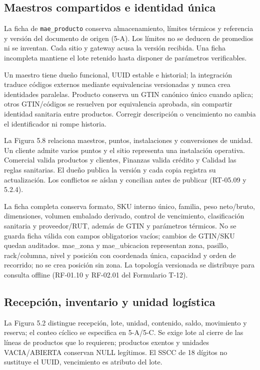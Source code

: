 \subsection{Maestros compartidos e identidad única}
\label{sec:sd5-5-1-3}

La ficha de \texttt{mae\_\allowbreak{}producto} conserva almacenamiento, límites térmicos y referencia y versión del documento de origen (5-A). Los límites no se deducen de promedios ni se inventan. Cada sitio y gateway acusa la versión recibida. Una ficha incompleta mantiene el lote retenido hasta disponer de parámetros verificables.

Un maestro tiene dueño funcional, UUID estable e historial; la integración traduce códigos externos mediante equivalencias versionadas y nunca crea identidades paralelas. Producto conserva un GTIN canónico único cuando aplica; otros GTIN/códigos se resuelven por equivalencia aprobada, sin compartir identidad sanitaria entre productos. Corregir descripción o vencimiento no cambia el identificador ni rompe historia.

La Figura 5.8 relaciona maestros, puntos, instalaciones y conversiones de unidad. Un cliente admite varios puntos y el sitio representa una instalación operativa. Comercial valida productos y clientes, Finanzas valida crédito y Calidad las reglas sanitarias. El dueño publica la versión y cada copia registra su actualización. Los conflictos se aíslan y concilian antes de publicar (RT-05.09 y 5.2.4).

La ficha completa conserva formato, SKU interno único, familia, peso neto/bruto, dimensiones, volumen embalado derivado, control de vencimiento, clasificación sanitaria y proveedor/RUT, además de GTIN y parámetros térmicos. No se guarda ficha válida con campos obligatorios vacíos; cambios de GTIN/SKU quedan auditados. mae\_zona y mae\_ubicacion representan zona, pasillo, rack/columna, nivel y posición con coordenada única, capacidad y orden de recorrido; no se crea posición sin zona. La topología versionada se distribuye para consulta offline (RF-01.10 y RF-02.01 del Formulario T-12).

\subsection{Recepción, inventario y unidad logística}
\label{sec:sd5-5-1-4}

La Figura 5.2 distingue recepción, lote, unidad, contenido, saldo, movimiento y reserva; el conteo cíclico se especifica en 5-A/5-C. Se exige lote al cierre de las líneas de productos que lo requieren; productos exentos y unidades VACIA/ABIERTA conservan NULL legítimos. El SSCC de 18 dígitos no sustituye el UUID, vencimiento es atributo del lote.

